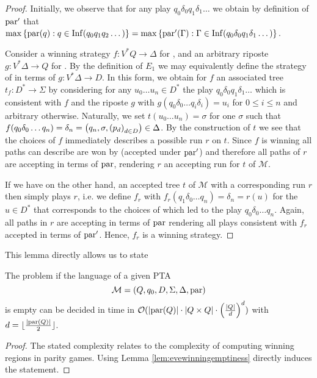 \begin{proof}
  Initially, we observe that for any play $q_{0}\delta_{0}q_{1}\delta_{1}\dots$ 
  we obtain by definition of $\operatorname{par}'$ that $\max\left\{\operatorname{par}(q):q\in\operatorname{Inf}(
  q_{0}q_{1}q_{2}\dots)\right\} = \max\left\{\operatorname{par}'(\Gamma):\Gamma\in\operatorname{Inf}(
  q_{0}\delta_{0}q_{1}\delta_{1}\dots)\right\}$.

  Consider a winning strategy $f:V^{*}Q\rightarrow\Delta$ for \eve{},
  and an arbitrary riposte $g:V^{*}\Delta\rightarrow Q$ for \adam{}. By
  the definition of $E_{1}$ we may equivalently define the strategy of 
  \adam{} in terms of $g:V^{*}\Delta\rightarrow D$. In this form, we 
  obtain for $f$ an associated tree $t_{f}:D^{*}\rightarrow\Sigma$ by
  considering for any $u_{0}\dots u_{n}\in D^{*}$ the play 
  $q_{0}\delta_{0}q_{1}\delta_{1}\dots$ which is consistent with $f$ and the
  riposte $g$ with $g(q_{0}\delta_{0}\dots q_{i}\delta_{i}) = u_{i}$ for 
  $0\leq i\leq n$ and arbitrary otherwise. Naturally, we set 
  $t(u_{0}\dots u_{n}) = \sigma$ for one $\sigma$ such that 
  $f(q_{0}\delta_{0}\dots q_{n}) = \delta_{n} 
    = \left(q_{n}, \sigma, \left(p_{d}\right)_{d\in D}\right)\in\Delta$. By the 
  construction of $t$ we see that the choices of $f$ immediately describes a 
  possible run $r$ on $t$. Since $f$ is winning all paths \adam{} can
  describe are won by \eve{} (accepted under $\operatorname{par}'$) and therefore 
  all paths of $r$ are accepting in terms of $\operatorname{par}$, rendering $r$ an
  accepting run for $t$ of $\mathcal{M}$.

  If we have on the other hand, an accepted tree $t$ of $\mathcal{M}$ with
  a corresponding run $r$ then \eve{} simply plays $r$, i.e. we define
  $f_{r}$ with $f_{r}(q_{1}\delta_{0}\dots q_{n}) = \delta_{n} = r(u)$ for 
  the $u\in D^{*}$ that corresponds to the choices of \adam{} which led 
  to the play $q_{0}\delta_{0}\dots q_{n}$. Again, all paths in $r$ are 
  accepting in terms of $\operatorname{par}$ rendering all plays consistent with $f_{r}$ 
  accepted in terms of $\operatorname{par}'$. Hence, $f_{r}$ is a winning strategy.
\end{proof}

This lemma directly allows us to state
\begin{theorem}
  \cite[Theorem 21]{AutoInfObj} \cite[Theorem 7.25]{AutoLogInfGames}
  The problem if the language of a given \ac{PTA}
  \begin{equation*}
    \mathcal{M} = \left(Q, q_{0}, D, \Sigma, \Delta, \operatorname{par}\right)
  \end{equation*}
  is empty can be decided in time in 
  $\mathcal{O}(\left\vert{\operatorname{par}(Q)}\right\vert\cdot\left\vert{Q\times Q}\right\vert\cdot\left(
    \frac{\left\vert{Q}\right\vert}{d}\right)^{d})$ with 
  $d = \lfloor \frac{\left\vert{\operatorname{par}(Q)}\right\vert}{2} \rfloor$.
  \label{thm:emptinessPTA}
\end{theorem}
\begin{proof}
  The stated complexity relates to the complexity of computing winning regions
  in parity games. Using Lemma \ref{lem:evewinningemptiness} directly induces
  the statement.
\end{proof}

